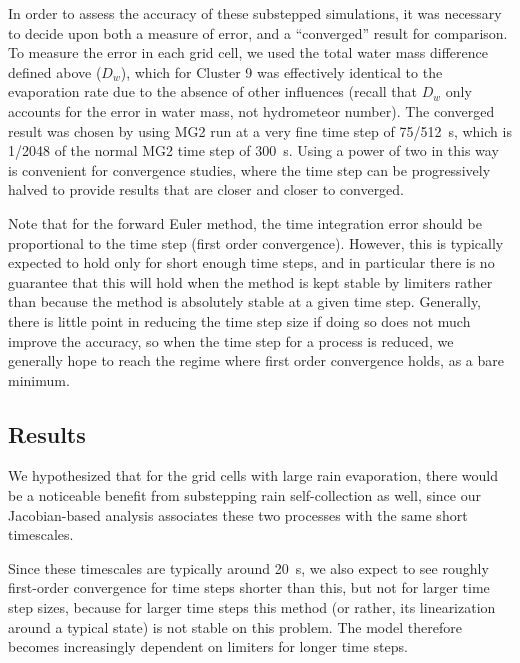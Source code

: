 \documentclass [11pt, proquest] {uwthesis}[2020/02/24]
\begin{document}
In order to assess the accuracy of these substepped simulations, it was necessary to decide upon both a measure of error, and a ``converged'' result for comparison. To measure the error in each grid cell, we used the total water mass difference defined above ($D_w$), which for Cluster 9 was effectively identical to the evaporation rate due to the absence of other influences (recall that $D_w$ only accounts for the error in water mass, not hydrometeor number). The converged result was chosen by using MG2 run at a very fine time step of \SI{75/512}{\second}, which is \num{1/2048} of the normal MG2 time step of \SI{300}{\second}. Using a power of two in this way is convenient for convergence studies, where the time step can be progressively halved to provide results that are closer and closer to converged.

Note that for the forward Euler method, the time integration error should be proportional to the time step (first order convergence). However, this is typically expected to hold only for short enough time steps, and in particular there is no guarantee that this will hold when the method is kept stable by limiters rather than because the method is absolutely stable at a given time step. Generally, there is little point in reducing the time step size if doing so does not much improve the accuracy, so when the time step for a process is reduced, we generally hope to reach the regime where first order convergence holds, as a bare minimum.

\subsection{Results}

We hypothesized that for the grid cells with large rain evaporation, there would be a noticeable benefit from substepping rain self-collection as well, since our Jacobian-based analysis associates these two processes with the same short timescales.

Since these timescales are typically around \SI{20}{\second}, we also expect to see roughly first-order convergence for time steps shorter than this, but not for larger time step sizes, because for larger time steps this method (or rather, its linearization around a typical state) is not stable on this problem. The model therefore becomes increasingly dependent on limiters for longer time steps.
\end{document}
